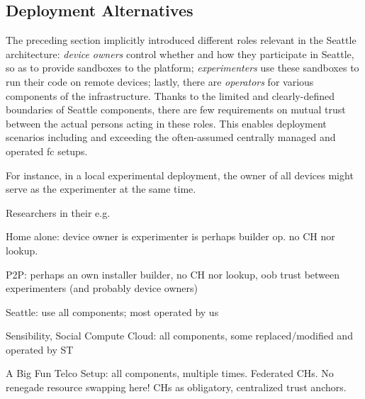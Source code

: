 \subsection{Deployment Alternatives}

The preceding section implicitly introduced different roles relevant
in the Seattle architecture:
\textit{device owners} control whether and how they participate
in Seattle, so as to provide sandboxes to the platform;
\textit{experimenters} use these sandboxes to run their code
on remote devices;
lastly, there are \textit{operators} for various components
of the infrastructure.
Thanks to the limited and clearly-defined boundaries of Seattle
components, there are few requirements on mutual trust between
the actual persons acting in these roles. This enables deployment
scenarios including and exceeding the often-assumed centrally managed
and operated \gls{fc} setups.

For instance, in a local experimental deployment, the owner of all
devices might serve as the experimenter at the same time.

Researchers in their e.g.

Home alone: device owner is experimenter is perhaps builder op.
no CH nor lookup.

P2P: perhaps an own installer builder, no CH nor lookup,
oob trust between experimenters (and probably device owners)

Seattle: use all components; most operated by us

Sensibility, Social Compute Cloud: all components, some replaced/modified
and operated by ST

A Big Fun Telco Setup: all components, multiple times. Federated CHs.
No renegade resource swapping here! CHs as obligatory, centralized trust
anchors.
